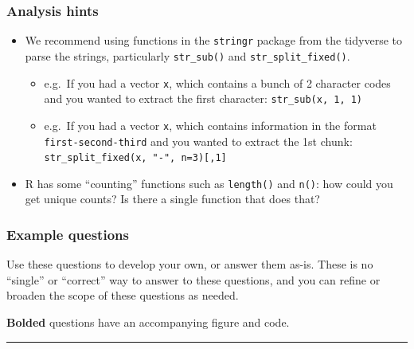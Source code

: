 \documentclass[
  letterpaper,
  DIV=11,
  numbers=noendperiod]{scrreprt}
\begin{document}
\begin{tcolorbox}[enhanced jigsaw, bottomtitle=1mm, bottomrule=.15mm, toprule=.15mm, opacityback=0, leftrule=.75mm, breakable, colback=white, toptitle=1mm, left=2mm, coltitle=black, titlerule=0mm, opacitybacktitle=0.6, title=\textcolor{quarto-callout-tip-color}{\faLightbulb}\hspace{0.5em}{Analysis ideas and hints}, rightrule=.15mm, arc=.35mm, colframe=quarto-callout-tip-color-frame, colbacktitle=quarto-callout-tip-color!10!white]

\subsubsection{Analysis hints}

\begin{itemize}
\item
  We recommend using functions in the \texttt{stringr} package from the
  tidyverse to parse the strings, particularly \texttt{str\_sub()} and
  \texttt{str\_split\_fixed()}.

  \begin{itemize}
  \item
    e.g.~If you had a vector \texttt{x}, which contains a bunch of 2
    character codes and you wanted to extract the first character:
    \texttt{str\_sub(x,\ 1,\ 1)}
  \item
    e.g.~If you had a vector \texttt{x}, which contains information in
    the format \texttt{first-second-third} and you wanted to extract the
    1st chunk: \texttt{str\_split\_fixed(x,\ "-",\ n=3){[},1{]}}
  \end{itemize}
\item
  R has some ``counting'' functions such as \texttt{length()} and
  \texttt{n()}: how could you get unique counts? Is there a single
  function that does that?
\end{itemize}

\subsubsection{Example questions}

Use these questions to develop your own, or answer them as-is. These is
no ``single'' or ``correct'' way to answer to these questions, and you
can refine or broaden the scope of these questions as needed.

\textbf{Bolded} questions have an accompanying figure and code.

\begin{center}\rule{0.5\linewidth}{0.5pt}\end{center}


\end{tcolorbox}
\end{document}
